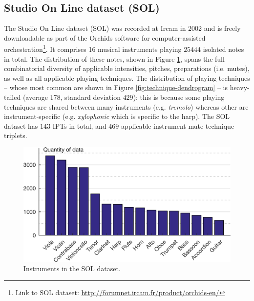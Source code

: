 \documentclass{article}
\makeatletter
\newcommand*{\eg}{e.g.\@\xspace}
\newcommand*{\ie}{i.e.\@\xspace}
\makeatother
\begin{document}
\subsection{Studio On Line dataset (SOL)}

The Studio On Line dataset (SOL) was recorded at Ircam in 2002 and is freely downloadable as part of the Orchids software for computer-assisted orchestration\footnote{Link to SOL dataset: \url{http://forumnet.ircam.fr/product/orchids-en/}}.
It comprises 16 musical instruments playing $25444$ isolated notes in total.
The distribution of these notes, shown in Figure \ref{fig:instrument-histogram}, spans the full combinatorial diversity of applicable intensities, pitches, preparations (\ie{} mutes), as well as all applicable playing techniques.
The distribution of playing techniques -- whose most common are shown in Figure \ref{fig:technique-dendrogram} -- is heavy-tailed (average $178$, standard deviation $429$): this is because some playing techniques are shared between many instruments (\eg{} \textit{tremolo}) whereas other are instrument-specific (\eg{} \textit{xylophonic} which is specific to the harp).
The SOL dataset has $143$ IPTs in total, and $469$ applicable instrument-mute-technique triplets.

\begin{figure}[t!]
\centering
\includegraphics[width=\linewidth]{./figs/histogram/histogram_instruments.png}
\caption{Instruments in the SOL dataset.}
\label{fig:instrument-histogram}
\end{figure}
\end{document}
